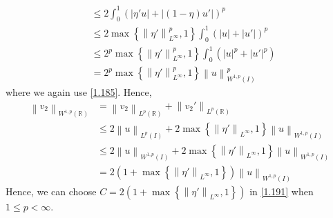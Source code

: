 \documentclass[a4paper,oneside]{article}
\numberwithin{equation}{section}
\begin{document}
\begin{enumerate}
\begin{align}
& \le 2\int_0^1 {{{\left( {\left| {\eta 'u} \right| + \left| {\left( {1 - \eta } \right)u'} \right|} \right)}^p}} \\
& \le 2\max \left\{ {\left\| {\eta '} \right\|_{{L^\infty }}^p,1} \right\}\int_0^1 {{{\left( {\left| u \right| + \left| {u'} \right|} \right)}^p}} \\
& \le {2^p}\max \left\{ {\left\| {\eta '} \right\|_{{L^\infty }}^p,1} \right\}\int_0^1 {\left( {{{\left| u \right|}^p} + {{\left| {u'} \right|}^p}} \right)} \\
& = {2^p}\max \left\{ {\left\| {\eta '} \right\|_{{L^\infty }}^p,1} \right\}\left\| u \right\|_{{W^{1,p}}\left( I \right)}^p
\end{align}
where we again use \eqref{1.185}. Hence, 
\begin{align}
{\left\| {{v_2}} \right\|_{{W^{1,p}}\left( \mathbb{R}  \right)}} &= {\left\| {{v_2}} \right\|_{{L^p}\left( \mathbb{R}  \right)}} + {\left\| {{v_2}'} \right\|_{{L^p}\left( \mathbb{R}  \right)}}\\
 &\le 2{\left\| u \right\|_{{L^p}\left( I \right)}} + 2\max \left\{ {{{\left\| {\eta '} \right\|}_{{L^\infty }}},1} \right\}{\left\| u \right\|_{{W^{1,p}}\left( I \right)}}\\
 &\le 2{\left\| u \right\|_{{W^{1,p}}\left( I \right)}} + 2\max \left\{ {{{\left\| {\eta '} \right\|}_{{L^\infty }}},1} \right\}{\left\| u \right\|_{{W^{1,p}}\left( I \right)}}\\
& = 2\left( {1 + \max \left\{ {{{\left\| {\eta '} \right\|}_{{L^\infty }}},1} \right\}} \right){\left\| u \right\|_{{W^{1,p}}\left( I \right)}}
\end{align}
Hence, we can choose $C = 2\left( {1 + \max \left\{ {{{\left\| {\eta '} \right\|}_{{L^\infty }}},1} \right\}} \right)$ in \eqref{1.191} when $1\le p<\infty$.
\end{enumerate}
\end{document}
